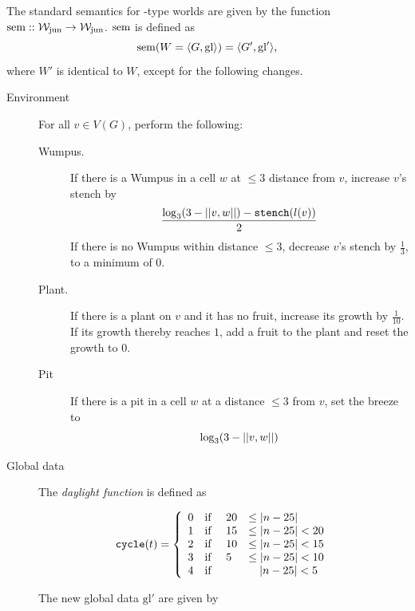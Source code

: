 \begin{definition}
\label{def:ssem}
The standard semantics for \wjun-type worlds are given by the function $\mathrm{sem} :: \mathtt{\mathcal{W}_{\mathrm{jun}} \rightarrow \mathcal{W}_{\mathrm{jun}}}$. $\mathrm{sem}$ is defined as 
$$\mathrm{sem}(W = \langle G, \mathrm{gl} \rangle) = \langle G', \mathrm{gl}' \rangle, $$
where $W'$ is identical to $W$, except for the following changes.\\

\begin{description}
	\item[Environment] For all $v \in V(G)$, perform the following:
	
	\begin{description}
		\item[Wumpus.] If there is a Wumpus in a cell $w$ at $\leq 3$ distance from $v$, increase $v$'s stench by
		$$
			\frac{
				\log_{3}(3 - ||{v},{w}||) - \mathtt{stench}(l(v))
			}{2}
		$$
		If there is no Wumpus within distance $\leq 3$, decrease $v$'s stench by $\frac{1}{3}$, to a minimum of 0.
		
		\item[Plant.] If there is a plant on $v$ and it has no fruit, increase its growth by $\frac{1}{10}$. If its growth thereby reaches $1$, add a fruit to the plant and reset the growth to 0.
		
		\item[Pit] If there is a pit in a cell $w$ at a distance $\leq 3$ from $v$, set the breeze to
 		$$
			\log_{3}(3 - ||{v},{w}||)
		$$
	\end{description}
	
	\item[Global data] The {\em daylight function} is defined as
	
	$$
			\mathtt{cycle}(t) = 
			\left\{
				\begin{array}{l l l l}
					0 & \textnormal{if } & 20 & \leq |n - 25|\\
					1 & \textnormal{if } & 15 & \leq |n - 25| < 20\\
					2 & \textnormal{if } & 10 & \leq |n - 25| < 15\\
					3 & \textnormal{if } & 5 & \leq |n - 25| < 10\\
					4 & \textnormal{if } & & \ \ \ |n - 25| < 5
				\end{array}
			\right.
	$$
	
	The new global data $\mathrm{gl}'$ are given by
	

\end{description}
\end{definition}

